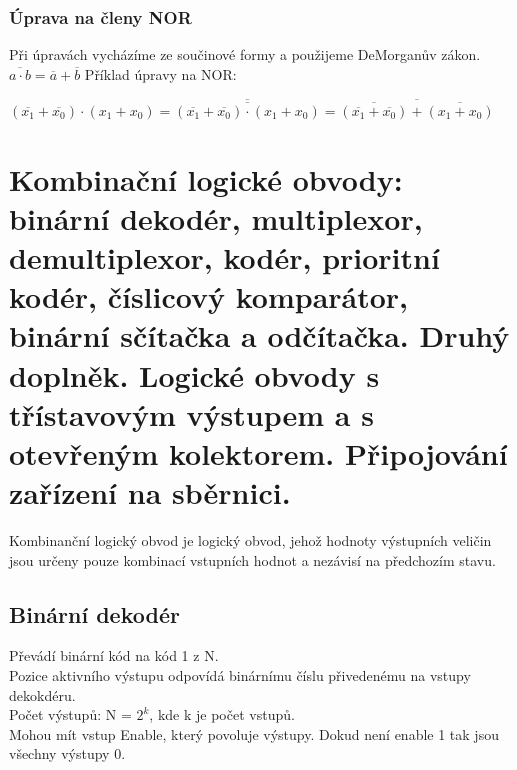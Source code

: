\subsubsection{Úprava na členy NOR}
Při úpravách vycházíme ze součinové formy a použijeme DeMorganův zákon. \(\overline{a \cdot b} = \overline{a} + \overline{b}\)
Příklad úpravy na NOR:
\begin{center}
    \((\overline{x_1}+\overline{x_0})\cdot (x_1 + x_0) = \overline{\overline{(\overline{x_1}+\overline{x_0})\cdot (x_1 + x_0)}} = \overline{\overline{(\overline{x_1}+\overline{x_0})}+\overline{(x_1+x_0)}}\)
\end{center}

\section{Kombinační logické obvody: binární dekodér, multiplexor, demultiplexor, kodér, prioritní kodér, číslicový komparátor, binární sčítačka a odčítačka. Druhý doplněk. Logické obvody s třístavovým výstupem a s otevřeným kolektorem. Připojování zařízení na sběrnici.}
Kombinanční logický obvod je logický obvod, jehož hodnoty výstupních veličin jsou určeny pouze kombinací vstupních hodnot a nezávisí na předchozím stavu.

\subsection{Binární dekodér}
Převádí binární kód na kód 1 z N.\\
Pozice aktivního výstupu odpovídá binárnímu číslu přivedenému na vstupy dekokdéru.\\
Počet výstupů: N = \(2^k\), kde k je počet vstupů.\\
Mohou mít vstup Enable, který povoluje výstupy. Dokud není enable 1 tak jsou všechny výstupy 0.

